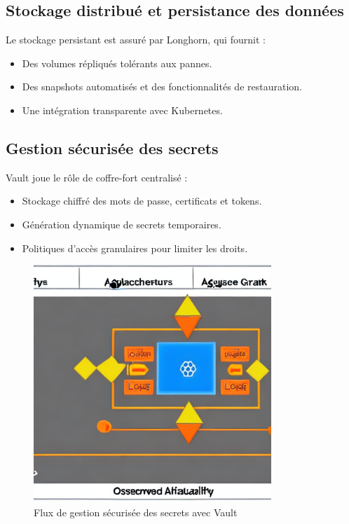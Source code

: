 \subsection{Stockage distribué et persistance des données}

Le stockage persistant est assuré par Longhorn, qui fournit :
\begin{itemize}
	\item Des volumes répliqués tolérants aux pannes.
	\item Des snapshots automatisés et des fonctionnalités de restauration.
	\item Une intégration transparente avec Kubernetes.
\end{itemize}

\subsection{Gestion sécurisée des secrets}

Vault joue le rôle de coffre-fort centralisé :
\begin{itemize}
	\item Stockage chiffré des mots de passe, certificats et tokens.
	\item Génération dynamique de secrets temporaires.
	\item Politiques d’accès granulaires pour limiter les droits.
\end{itemize}

\begin{figure}[H]
	\centering
	\includegraphics[width=0.8\textwidth]{figures/observabilite-stack.png}
	\caption{Flux de gestion sécurisée des secrets avec Vault}
\end{figure}

